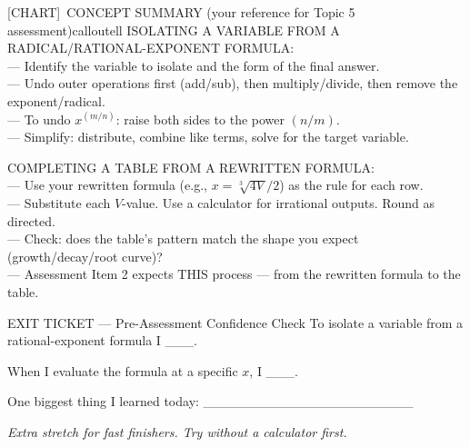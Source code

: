 \documentclass[11pt]{article}
\newcommand{\IconChart}{[CHART]}
\begin{document}
\begin{callout}{\IconChart\ CONCEPT SUMMARY (your reference for Topic 5 assessment)}{calloutell}
ISOLATING A VARIABLE FROM A RADICAL/RATIONAL-EXPONENT FORMULA:\\
\hspace*{1.4em}--- Identify the variable to isolate and the form of the final answer.\\
\hspace*{1.4em}--- Undo outer operations first (add/sub), then multiply/divide, then remove the exponent/radical.\\
\hspace*{1.4em}--- To undo \(x^{(m/n)}\): raise both sides to the power \((n/m)\).\\
\hspace*{1.4em}--- Simplify: distribute, combine like terms, solve for the target variable.

\medskip
COMPLETING A TABLE FROM A REWRITTEN FORMULA:\\
\hspace*{1.4em}--- Use your rewritten formula (e.g., \(x = \sqrt[3]{4V} / 2\)) as the rule for each row.\\
\hspace*{1.4em}--- Substitute each \(V\)-value. Use a calculator for irrational outputs. Round as directed.\\
\hspace*{1.4em}--- Check: does the table's pattern match the shape you expect (growth/decay/root curve)?\\
\hspace*{1.4em}--- Assessment Item 2 expects THIS process --- from the rewritten formula to the table.
\end{callout}


\begin{summaryexitbox}{EXIT TICKET --- Pre-Assessment Confidence Check}
To isolate a variable from a rational-exponent formula I \_\_\_.

When I evaluate the formula at a specific \(x\), I \_\_\_.

One biggest thing I learned today: \_\_\_\_\_\_\_\_\_\_\_\_\_\_\_\_\_\_\_\_\_\_
\end{summaryexitbox}

\clearpage

\textit{Extra stretch for fast finishers. Try without a calculator first.}
\end{document}
